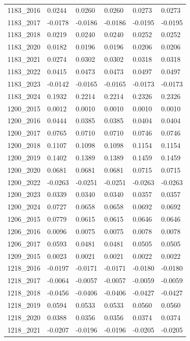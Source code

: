 \begin{table}[htbp]
\begin{tabular}{llllll}
1183_2016 & 0.0244 & 0.0260 & 0.0260 & 0.0273 & 0.0273 \\
1183_2017 & -0.0178 & -0.0186 & -0.0186 & -0.0195 & -0.0195 \\
1183_2018 & 0.0219 & 0.0240 & 0.0240 & 0.0252 & 0.0252 \\
1183_2020 & 0.0182 & 0.0196 & 0.0196 & 0.0206 & 0.0206 \\
1183_2021 & 0.0274 & 0.0302 & 0.0302 & 0.0318 & 0.0318 \\
1183_2022 & 0.0415 & 0.0473 & 0.0473 & 0.0497 & 0.0497 \\
1183_2023 & -0.0142 & -0.0165 & -0.0165 & -0.0173 & -0.0173 \\
1183_2024 & 0.1932 & 0.2214 & 0.2214 & 0.2326 & 0.2326 \\
1200_2015 & 0.0012 & 0.0010 & 0.0010 & 0.0010 & 0.0010 \\
1200_2016 & 0.0444 & 0.0385 & 0.0385 & 0.0404 & 0.0404 \\
1200_2017 & 0.0765 & 0.0710 & 0.0710 & 0.0746 & 0.0746 \\
1200_2018 & 0.1107 & 0.1098 & 0.1098 & 0.1154 & 0.1154 \\
1200_2019 & 0.1402 & 0.1389 & 0.1389 & 0.1459 & 0.1459 \\
1200_2020 & 0.0681 & 0.0681 & 0.0681 & 0.0715 & 0.0715 \\
1200_2022 & -0.0263 & -0.0251 & -0.0251 & -0.0263 & -0.0263 \\
1200_2023 & 0.0339 & 0.0340 & 0.0340 & 0.0357 & 0.0357 \\
1200_2024 & 0.0727 & 0.0658 & 0.0658 & 0.0692 & 0.0692 \\
1206_2015 & 0.0779 & 0.0615 & 0.0615 & 0.0646 & 0.0646 \\
1206_2016 & 0.0096 & 0.0075 & 0.0075 & 0.0078 & 0.0078 \\
1206_2017 & 0.0593 & 0.0481 & 0.0481 & 0.0505 & 0.0505 \\
1209_2015 & 0.0023 & 0.0021 & 0.0021 & 0.0022 & 0.0022 \\
1218_2016 & -0.0197 & -0.0171 & -0.0171 & -0.0180 & -0.0180 \\
1218_2017 & -0.0064 & -0.0057 & -0.0057 & -0.0059 & -0.0059 \\
1218_2018 & -0.0456 & -0.0406 & -0.0406 & -0.0427 & -0.0427 \\
1218_2019 & 0.0594 & 0.0533 & 0.0533 & 0.0560 & 0.0560 \\
1218_2020 & 0.0388 & 0.0356 & 0.0356 & 0.0374 & 0.0374 \\
1218_2021 & -0.0207 & -0.0196 & -0.0196 & -0.0205 & -0.0205 \\

\end{tabular}
\end{table}
